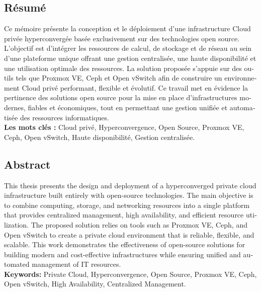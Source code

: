 \documentclass[a4paper,12pt]{article}
\begin{document}
\thispagestyle{empty}

\begin{french}
\section*{Résumé}

Ce mémoire présente la conception et le déploiement d’une infrastructure Cloud privée hyperconvergée basée exclusivement sur des technologies open source. L’objectif est d’intégrer les ressources de calcul, de stockage et de réseau au sein d’une plateforme unique offrant une gestion centralisée, une haute disponibilité et une utilisation optimale des ressources. La solution proposée s’appuie sur des outils tels que Proxmox VE, Ceph et Open vSwitch afin de construire un environnement Cloud privé performant, flexible et évolutif. Ce travail met en évidence la pertinence des solutions open source pour la mise en place d’infrastructures modernes, fiables et économiques, tout en permettant une gestion unifiée et automatisée des ressources informatiques. \\

\textbf{Les mots clés :} Cloud privé, Hyperconvergence, Open Source, Proxmox VE, Ceph, Open vSwitch, Haute disponibilité, Gestion centralisée.
\end{french}

\vspace{0.5cm}

\begin{english}
\section*{Abstract}

This thesis presents the design and deployment of a hyperconverged private cloud infrastructure built entirely with open-source technologies. The main objective is to combine computing, storage, and networking resources into a single platform that provides centralized management, high availability, and efficient resource utilization. The proposed solution relies on tools such as Proxmox VE, Ceph, and Open vSwitch to create a private cloud environment that is reliable, flexible, and scalable. This work demonstrates the effectiveness of open-source solutions for building modern and cost-effective infrastructures while ensuring unified and automated management of IT resources.\\

\textbf{Keywords:} Private Cloud, Hyperconvergence, Open Source, Proxmox VE, Ceph, Open vSwitch, High Availability, Centralized Management.
\end{english}
\end{document}
